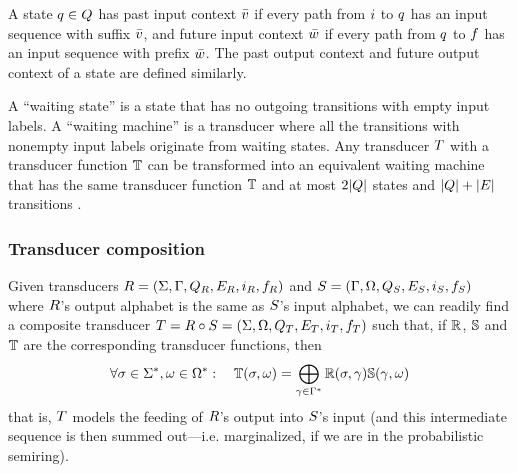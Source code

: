 \documentclass[english]{article}
\begin{document}
A state $q \in Q$ has past input context $\bar{v}$ if every path from $i$ to $q$ has an input sequence with suffix $\bar{v}$,
and future input context $\bar{w}$ if every path from $q$ to $f$ has an input sequence with prefix $\bar{w}$.
The past output context and future output context of a state are defined similarly.

A ``waiting state'' is a state that has no outgoing transitions with empty input labels.
A ``waiting machine'' is a transducer where all the transitions with nonempty input labels
originate from waiting states.
Any transducer $T$ with a transducer function $\mathbb{T}$
can be transformed into an equivalent waiting machine
that has the same transducer function $\mathbb{T}$ and
at most $2|Q|$ states and $|Q|+|E|$ transitions
\cite{WestessonEtAlArxiv2012}.

\subsubsection{Transducer composition}

Given transducers
 $R = (\Sigma, \Gamma, Q_{R}, E_{R}, i_{R}, f_{R})$ and
 $S = (\Gamma, \Omega, Q_{S}, E_{S}, i_{S}, f_{S})$
where $R$'s output alphabet is the same as $S$'s input alphabet,
we can readily find a composite transducer
 $T = R \circ S = (\Sigma, \Omega, Q_{T}, E_{T}, i_{T}, f_{T})$
such that, if $\mathbb{R}$, $\mathbb{S}$ and $\mathbb{T}$ are the corresponding transducer functions,
then
\[
\forall \sigma \in {\Sigma}^{\ast}, \omega \in {\Omega}^{\ast}:
\quad
\mathbb{T}(\sigma,\omega) = \bigoplus_{\gamma \in {\Gamma}^{\ast}} \mathbb{R}(\sigma,\gamma) \mathbb{S}(\gamma,\omega)
\]
that is, $T$ models the feeding of $R$'s output into $S$'s input
(and this intermediate sequence is then summed out---i.e. marginalized, if we are in the probabilistic semiring).
\end{document}
